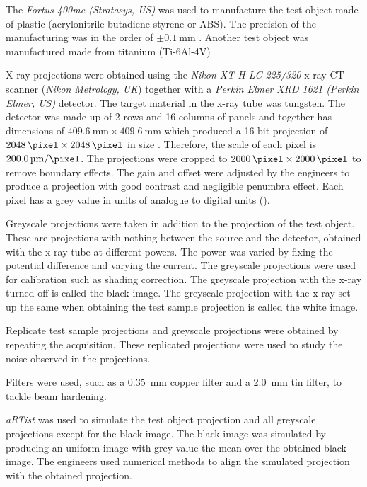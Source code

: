 The \emph{Fortus 400mc (Stratasys, US)} was used to manufacture the test object made of plastic (acrylonitrile butadiene styrene or ABS). The precision of the manufacturing was in the order of $\pm\SI{0.1}{\milli\metre}$ \citep{hanseen2013fortus}. Another test object was manufactured made from titanium (Ti-6Al-4V)

X-ray projections were obtained using the \emph{Nikon XT H LC 225/320} x-ray CT scanner (\emph{Nikon Metrology, UK}) together with a \emph{Perkin Elmer XRD 1621 (Perkin Elmer, US)} detector. The target material in the x-ray tube was tungsten. The detector was made up of 2 rows and 16 columns of panels and together has dimensions of $\SI{409.6}{\milli\metre}\times\SI{409.6}{\milli\metre}$ which produced a 16-bit projection of $\SI{2048}{\pixel}\times\SI{2048}{\pixel}$ in size \citep{perkinelmer2006xrd}. Therefore, the scale of each pixel is $\SI{200.0}{\micro\metre\per\pixel}$. The projections were cropped to $\SI{2000}{\pixel}\times\SI{2000}{\pixel}$ to remove boundary effects. The gain and offset were adjusted by the engineers to produce a projection with good contrast and negligible penumbra effect. Each pixel has a grey value in units of analogue to digital units (\SI{}{\adu}).

Greyscale projections were taken in addition to the projection of the test object. These are projections with nothing between the source and the detector, obtained with the x-ray tube at different powers. The power was varied by fixing the potential difference and varying the current. The greyscale projections were used for calibration such as shading correction. The greyscale projection with the x-ray turned off is called the black image. The greyscale projection with the x-ray set up the same when obtaining the test sample projection is called the white image.

Replicate test sample projections and greyscale projections were obtained by repeating the acquisition. These replicated projections were used to study the noise observed in the projections.

Filters were used, such as a \SI{0.35}{\milli\metre} copper filter and a \SI{2.0}{\milli\metre} tin filter, to tackle beam hardening.

\emph{aRTist} was used to simulate the test object projection and all greyscale projections except for the black image. The black image was simulated by producing an uniform image with grey value the mean over the obtained black image. The engineers used numerical methods to align the simulated projection with the obtained projection.


